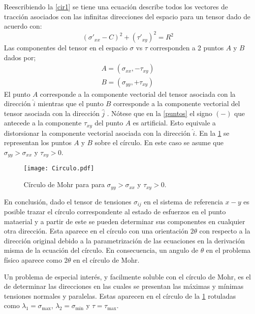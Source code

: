 \documentclass[../notas medios.tex]{subfiles}
\begin{document}
Reescribiendo la \cref{cir1} se tiene una ecuación describe todos los vectores de tracción asociados con las infinitas direcciones del espacio para un tensor dado de acuerdo con: \\
%
\begin{equation}
	\left(\sigma '_{xx}- C \right) ^2 + \left(\tau ' _{xy} \right) ^2 = R^2
\end{equation}
%
Las componentes del tensor en el espacio $\sigma$ vs $\tau $  corresponden a 2 puntos $A$  y $B$  dados por;\\
%
\begin{equation}
	\begin{array}{ccc}
	A=(\sigma_{xx}, -\tau _{xy}) \\
	B=(\sigma_{yy}, +\tau _{xy})
	\end{array}
	\label{puntos}
\end{equation}
%
El punto $A$  corresponde a la componente vectorial del tensor asociada con la dirección $\hat{i}$  mientras que el punto  $B$ corresponde a la componente vectorial del tensor asociada con la dirección $\hat{j}$ .  Nótese que en la \cref{puntos} el signo $(-)$  que antecede a la componente $\tau_{xy}$  del punto  $A$ es artificial.  Esto equivale a distorsionar la componente vectorial asociada con la dirección $\hat{i}$.  En la \cref{circulo} se representan los puntos $A$ y $B$ sobre el círculo. En este caso se asume que $\sigma_{yy} > \sigma_{xx}$ y $\tau_{xy} > 0$.\\
%
\begin{figure}[H]
\centering
\texttt{[image: Circulo.pdf]}
\caption{Círculo de Mohr para para $\sigma_{yy} > \sigma_{xx}$ y $\tau_{xy} > 0$.}
\label{circulo}
\end{figure}

En conclusión, dado el tensor de tensiones $\sigma_{ij}$ en el sistema de referencia $x-y$ es posible trazar el círculo correspondente al estado de esfuerzos en el punto mataerial y a partir de este se pueden determinar sus componentes en cualquier otra dirección. Esta aparece en el círculo con una orientación $2\theta$ con respecto a la dirección original debido a la parametrización de las ecuaciones en la derivación misma de la ecuación del círculo. En consecuencia, un angulo de $\theta$ en el problema físico aparece como  $2\theta$ en el círculo de Mohr.

Un problema de especial interés, y facilmente soluble con el círculo de Mohr, es el de determinar las direcciones en las cuales se presentan las máximas y mínimas tensiones normales y paralelas. Estas aparecen en el círculo de la \cref{circulo} rotuladas como ${\lambda _1} = {\sigma _{\max }}$, ${\lambda _2} = {\sigma _{\min }}$ y $\tau  = {\tau _{\max }}.$
\end{document}
